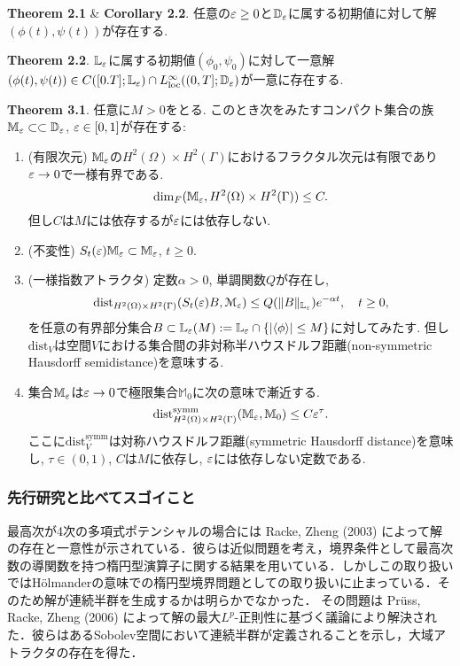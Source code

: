 \documentclass[openary, a4paper, oneside]{jsarticle}
\begin{document}
		{\bf Theorem 2.1} \& {\bf Corollary 2.2}.
		任意の$\varepsilon\geq 0$と$\mathbb{D}_{\varepsilon}$に属する初期値に対して解$(\phi(t),\psi(t))$が存在する.

		{\bf Theorem 2.2}.
		$\mathbb{L}_{\varepsilon}$に属する初期値$(\phi_0,\psi_0)$に対して一意解$(\phi(t),\psi(t))\in C([0.T];\mathbb{L}_{\varepsilon}) \cap L^{\infty}_{\text{loc}}((0,T];\mathbb{D}_{\varepsilon})$が一意に存在する.

		{\bf Theorem 3.1}.
		任意に$M>0$をとる.
		このとき次をみたすコンパクト集合の族$\mathbb{M}_{\varepsilon}\subset\subset \mathbb{D}_{\varepsilon}$, $\varepsilon\in[0,1]$が存在する:
		\begin{enumerate}
			\item (有限次元) $\mathbb{M}_{\varepsilon}$の$H^2(\Omega)\times H^2(\Gamma)$におけるフラクタル次元は有限であり$\varepsilon\to 0$で一様有界である.
			\begin{equation}
				\dim_F(\mathbb{M}_{\varepsilon}, H^2(\Omega)\times H^2(\Gamma))\leq C.
			\end{equation}
			但し$C$は$M$には依存するが$\varepsilon$には依存しない.
			\item (不変性) $S_t(\varepsilon)\mathbb{M}_{\varepsilon} \subset \mathbb{M}_{\varepsilon}$, $t\geq 0$.
			\item (一様指数アトラクタ) 定数$\alpha>0$, 単調関数$Q$が存在し,
			\begin{equation}
				\mathrm{dist}_{H^2(\Omega)\times H^2(\Gamma)}(S_t(\varepsilon)B, \mathcal{M}_{\varepsilon}) \leq Q(\| B\|_{\mathbb{L}_{\varepsilon}})e^{-\alpha t},\quad t\geq 0,
			\end{equation}
			を任意の有界部分集合$B\subset \mathbb{L}_{\varepsilon}(M):=\mathbb{L}_{\varepsilon} \cap \{|\langle\phi\rangle|\leq M\}$に対してみたす.
			但し$\mathrm{dist}_V$は空間$V$における集合間の非対称半ハウスドルフ距離(non-symmetric Hausdorff semidistance)を意味する.
			\item 集合$\mathbb{M}_{\varepsilon}$は$\varepsilon\to 0$で極限集合$\mathbb{M}_0$に次の意味で漸近する.
			\begin{equation}
				\mathrm{dist}_{H^2(\Omega)\times H^2(\Gamma)}^{\text{symm}}(\mathbb{M}_{\varepsilon},\mathbb{M}_0)\leq C\varepsilon^{\tau}.
			\end{equation}
			ここに$\mathrm{dist}_V^{\text{symm}}$は対称ハウスドルフ距離(symmetric Hausdorff distance)を意味し, $\tau\in (0,1)$, $C$は$M$に依存し, $\varepsilon$には依存しない定数である.
		\end{enumerate}
	\subsubsection{先行研究と比べてスゴイこと}
		最高次が4次の多項式ポテンシャルの場合には Racke, Zheng (2003) \cite{RackeZheng2003} によって解の存在と一意性が示されている．彼らは近似問題を考え，境界条件として最高次数の導関数を持つ楕円型演算子に関する結果を用いている．しかしこの取り扱いではH\"olmanderの意味での楕円型境界問題としての取り扱いに止まっている．そのため解が連続半群を生成するかは明らかでなかった．
		その問題は Pr\"uss, Racke, Zheng (2006) \cite{PrussRackeZheng2006} によって解の最大$L^p$-正則性に基づく議論により解決された．彼らはあるSobolev空間において連続半群が定義されることを示し，大域アトラクタの存在を得た．
\end{document}
